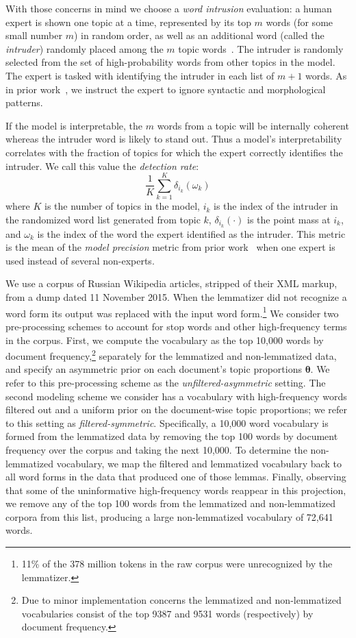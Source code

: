\documentclass[11pt,letterpaper]{article}
\renewcommand{\vec}{\boldsymbol}   %
\newcommand{\vtheta}{{\vec{\theta}}}
\newcommand{\dirac}[2]{\delta_{#1}\left(#2\right)}
\begin{document}
{With those concerns in mind we choose a \emph{word intrusion}
evaluation:
a human expert is shown one topic at a time, represented
by its top $m$ words (for some small number $m$) in random order, as
well as an additional word (called the \emph{intruder}) randomly placed
among the $m$ topic words~\cite{chang2009}.
The intruder is randomly selected from the set of high-probability
words from other topics in the model.
The expert is tasked with identifying the intruder in each list of
$m + 1$ words.
As in prior work~\cite{chang2009}, we instruct the expert to ignore
syntactic and morphological patterns.

If the model is interpretable, the $m$ words from a topic will be
internally coherent whereas the intruder word is likely to stand out.
Thus a model's interpretability correlates with the fraction
of topics for which the expert correctly identifies the intruder.  We
call this value the \emph{detection rate}:
\begin{equation*}
    \frac{1}{K} \sum_{k=1}^K \dirac{i_k}{\omega_k}
\end{equation*}
where $K$ is the number of topics in the model, $i_k$ is the index
of the intruder in the randomized word list generated from topic $k$,
$\dirac{i_k}{\cdot}$ is the point mass at $i_k$,
and $\omega_k$ is the index of the word the expert identified as the
intruder.  This metric is the mean of the
\emph{model precision} metric from prior work~\cite{chang2009}
when one expert is used instead of several non-experts.

We use a corpus of Russian Wikipedia articles, stripped of their XML
markup, from a dump dated 11 November 2015.
When the lemmatizer did not recognize a word form
its output was replaced with the input word form.\footnote{
    11\% of the 378 million tokens in the raw corpus were
    unrecognized by the lemmatizer.
}
We consider two pre-processing schemes to account for stop words and
other high-frequency terms in the corpus.  First, we compute the
vocabulary as the top 10,000 words by document frequency,\footnote{
    Due to minor implementation concerns the lemmatized and
    non-lemmatized vocabularies consist of the top 9387 and 9531 words
    (respectively) by document frequency.
}
separately for the lemmatized and non-lemmatized data, and
specify an asymmetric prior on each document's topic proportions
$\vtheta$.  We refer to this pre-processing scheme as the
\emph{unfiltered-asymmetric} setting.  The second modeling scheme we
consider has a vocabulary with high-frequency words filtered out and a
uniform prior on the document-wise topic proportions;
we refer to this setting as \emph{filtered-symmetric}.
Specifically, a 10,000 word vocabulary is formed from the
lemmatized data by removing the top 100 words by document frequency
over the corpus and taking the next 10,000.  To determine the
non-lemmatized vocabulary, we map the filtered and lemmatized
vocabulary back to all word forms in the data that produced one of
those lemmas.
Finally, observing that some of the uninformative
high-frequency words reappear in this projection, we remove any
of the top 100 words from the lemmatized and non-lemmatized corpora
from this list, producing a large non-lemmatized vocabulary of 72,641
words.

}
\end{document}
